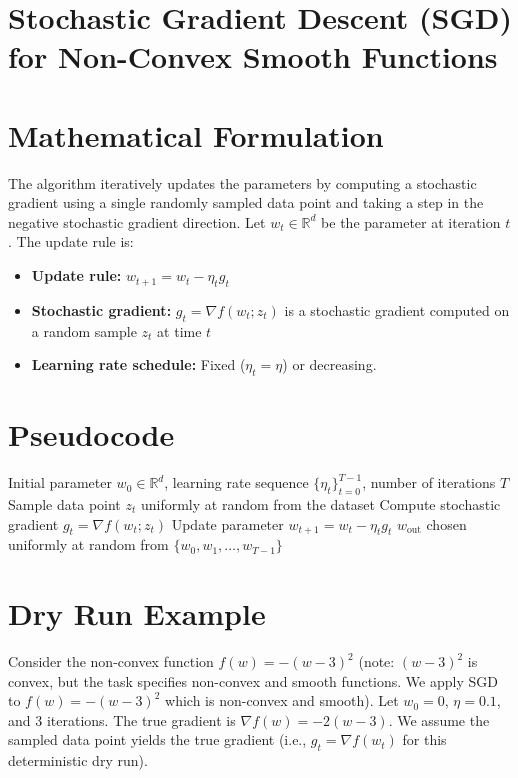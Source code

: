 \documentclass{article}
\begin{document}
\section*{Stochastic Gradient Descent (SGD) for Non-Convex Smooth Functions}

\section*{Mathematical Formulation}
The algorithm iteratively updates the parameters by computing a stochastic gradient using a single randomly sampled data point and taking a step in the negative stochastic gradient direction. Let $w_t \in \mathbb{R}^d$ be the parameter at iteration $t$. The update rule is:
\begin{itemize}
    \item \textbf{Update rule:} $w_{t+1} = w_t - \eta_t g_t$
    \item \textbf{Stochastic gradient:} $g_t = \nabla f(w_t; z_t)$ is a stochastic gradient computed on a random sample $z_t$ at time $t$
    \item \textbf{Learning rate schedule:} Fixed ($\eta_t = \eta$) or decreasing.
\end{itemize}

\section*{Pseudocode}
\begin{algorithm}[H]
\caption{Stochastic Gradient Descent (SGD)}
\begin{algorithmic}[1]
\REQUIRE Initial parameter $w_0 \in \mathbb{R}^d$, learning rate sequence $\{\eta_t\}_{t=0}^{T-1}$, number of iterations $T$
    \STATE Sample data point $z_t$ uniformly at random from the dataset
    \STATE Compute stochastic gradient $g_t = \nabla f(w_t; z_t)$
    \STATE Update parameter $w_{t+1} = w_t - \eta_t g_t$
\ENDFOR
\RETURN $w_{\text{out}}$ chosen uniformly at random from $\{w_0, w_1, \dots, w_{T-1}\}$
\end{algorithmic}
\end{algorithm}

\section*{Dry Run Example}
Consider the non-convex function $f(w) = -(w-3)^2$ (note: $(w-3)^2$ is convex, but the task specifies non-convex and smooth functions. We apply SGD to $f(w)=-(w-3)^2$ which is non-convex and smooth). 
Let $w_0 = 0$, $\eta = 0.1$, and 3 iterations. The true gradient is $\nabla f(w) = -2(w-3)$. We assume the sampled data point yields the true gradient (i.e., $g_t = \nabla f(w_t)$ for this deterministic dry run).
\end{document}
